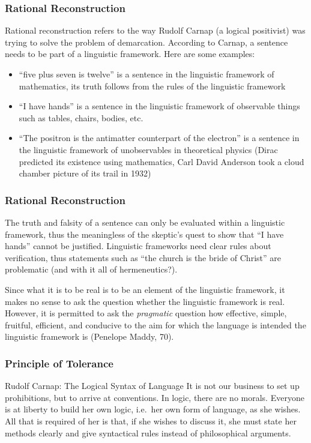 \documentclass[xcolor=dvipsnames]{beamer}
\begin{document}
\begin{frame}
  \frametitle{Rational Reconstruction}
  \alert{Rational reconstruction} refers to the way Rudolf Carnap (a
  logical positivist) was trying to solve the problem of demarcation.
  According to Carnap, a sentence needs to be part of a linguistic
  framework. Here are some examples:
  \begin{itemize}
  \item ``five plus seven is twelve'' is a sentence in the linguistic
    framework of mathematics, its truth follows from the rules of the
    linguistic framework
  \item ``I have hands'' is a sentence in the linguistic framework of
    observable things such as tables, chairs, bodies, etc.
  \item ``The positron is the antimatter counterpart of the electron''
    is a sentence in the linguistic framework of unobservables in
    theoretical physics (Dirac predicted its existence using
    mathematics, Carl David Anderson took a cloud chamber picture of
    its trail in 1932)
  \end{itemize}
\end{frame}

\begin{frame}
  \frametitle{Rational Reconstruction}
The truth and falsity of a sentence can only be evaluated within a
linguistic framework, thus the meaningless of the skeptic's quest to
show that ``I have hands'' cannot be justified. Linguistic frameworks
need clear rules about verification, thus statements such as ``the
church is the bride of Christ'' are problematic (and with it all of
hermeneutics?).

\bigskip

Since what it is to be real is to be an element of the linguistic
framework, it makes no sense to ask the question whether the
linguistic framework is real. However, it is permitted to ask the
\emph{pragmatic} question how effective, simple, fruitful, efficient,
and conducive to the aim for which the language is intended the
linguistic framework is (Penelope Maddy, 70).
\end{frame}

\begin{frame}
  \frametitle{Principle of Tolerance}
  \begin{block}{Rudolf Carnap: The Logical Syntax of Language}
    It is not our business to set up prohibitions, but to arrive at
    conventions. In logic, there are no morals. Everyone is at
    liberty to build her own logic, i.e.\ her own form of language, as
    she wishes. All that is required of her is that, if she wishes to
    discuss it, she must state her methods clearly and give
    syntactical rules instead of philosophical arguments.
  \end{block}
\end{frame}
\end{document}
